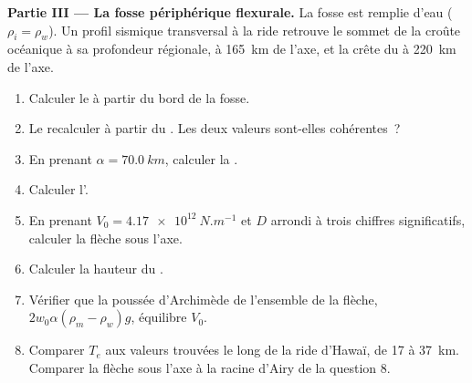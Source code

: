 \begin{problem}
\noindent\textbf{Partie III --- La fosse périphérique flexurale.} La fosse est remplie d'eau
($\rho_i = \rho_w$). Un profil sismique transversal à la ride retrouve le sommet de la
croûte océanique à sa profondeur régionale, à \qty{165}{km} de l'axe, et la
crête du  à \qty{220}{km} de l'axe.
\begin{enumerate}[resume]
  \item Calculer le  à partir du bord de la fosse.
  \item Le recalculer à partir du . Les deux valeurs sont-elles cohérentes~?
  \item En prenant $\alpha = \qty{70.0}{km}$, calculer la .
  \item Calculer l'.
  \item En prenant $V_0 = \qty{4.17e12}{N.m^{-1}}$ et $D$ arrondi à trois
        chiffres significatifs, calculer la flèche sous l'axe.
  \item Calculer la hauteur du .
  \item Vérifier que la poussée d'Archimède de l'ensemble de la flèche, $2w_0\alpha(\rho_m -
        \rho_w)g$, équilibre $V_0$.
  \item Comparer $T_e$ aux valeurs trouvées le long de la ride d'Hawaï, de 17 à
        \qty{37}{km}. Comparer la flèche sous l'axe à la racine d'Airy
        de la question 8.
\end{enumerate}


\end{problem}
